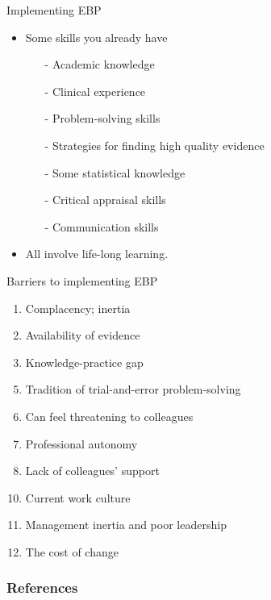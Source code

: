 \documentclass{beamer}
\begin{document}

% 
\begin{frame}{Implementing EBP}
	\begin{itemize}
	\item Some skills you already have
		\begin{itemize}
		\item[-] Academic knowledge
		\item[-] Clinical experience
		\item[-] Problem-solving skills
		\item[-] Strategies for finding high quality evidence
		\item[-] Some statistical knowledge
		\item[-] Critical appraisal skills
		\item[-] Communication skills
		\end{itemize}
	\item All involve \alert{life-long learning}.
	\end{itemize}
\end{frame}

% 
\begin{frame}{Barriers to implementing EBP}
	\begin{enumerate}
	\item Complacency; inertia 
	\item Availability of evidence
	\item Knowledge-practice gap
	\item[]
	\item Tradition of trial-and-error problem-solving
	\item Can feel threatening to colleagues
	\item Professional autonomy 
	\item Lack of colleagues' support 
	\item[]
	\item Current work culture
	\item Management inertia and poor leadership
	\item The cost of change
	\end{enumerate}
\end{frame}

\begin{frame}[allowframebreaks] %
	\begin{center}
	\frametitle{References}
	
	\small
	\end{center}
\end{frame}
\end{document}
